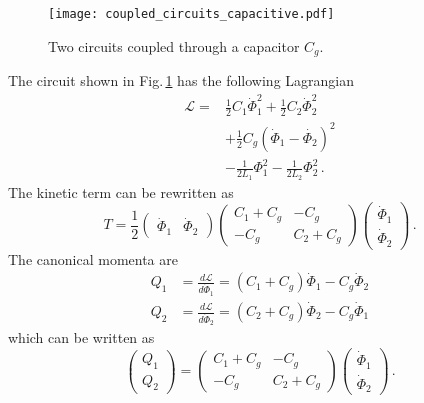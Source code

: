 

\begin{figure}
\begin{centering}
\texttt{[image: coupled\_circuits\_capacitive.pdf]}
\par\end{centering}
\caption{Two circuits coupled through a capacitor $C_g$.}
\label{Fig:coupledCircuits_capacitive}
\end{figure}

The circuit shown in Fig.\,\ref{Fig:coupledCircuits_capacitive} has the following Lagrangian
\begin{align}
  \mathcal{L} = & \frac{1}{2}C_1\dot{\Phi}_1^2 + \frac{1}{2}C_2\dot{\Phi}_2^2 \nonumber \\
  & + \frac{1}{2}C_g \left( \dot{\Phi}_1 - \dot{\Phi_2} \right)^2 \nonumber \\
  & - \frac{1}{2L_1}\Phi_1^2 - \frac{1}{2L_2}\Phi_2^2 \, .
\end{align}
The kinetic term can be rewritten as
\begin{equation}
  T = \frac{1}{2}
  \left( \begin{array}{cc} \dot{\Phi}_1 & \dot{\Phi}_2 \end{array} \right)
  \left( \begin{array}{cc} C_1 + C_g & -C_g \\ -C_g & C_2 + C_g \end{array} \right)
  \left( \begin{array}{c} \dot{\Phi}_1 \\ \dot{\Phi}_2 \end{array} \right) \label{eq:kineticInFlux}
  \, .
\end{equation}
The canonical momenta are
\begin{align}
  Q_1 &= \frac{d \mathcal{L}}{d\dot{\Phi}_1} = (C_1 + C_g) \dot{\Phi}_1 - C_g\dot{\Phi}_2 \nonumber \\
  Q_2 &= \frac{d \mathcal{L}}{d\dot{\Phi}_2} = (C_2 + C_g) \dot{\Phi}_2 - C_g\dot{\Phi}_1
\end{align}
which can be written as
\begin{equation}
  \left( \begin{array}{c} Q_1 \\ Q_2 \end{array} \right) =
  \left( \begin{array}{cc} C_1 + C_g & -C_g \\ -C_g & C_2 + C_g \end{array} \right)
  \left( \begin{array}{c} \dot{\Phi}_1 \\ \dot{\Phi}_2 \end{array} \right)
  \, .
\end{equation}
